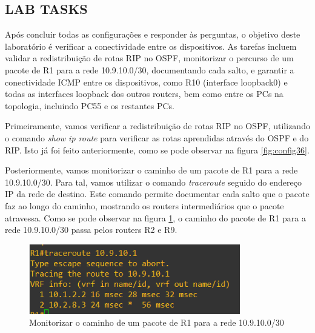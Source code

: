 \documentclass[11pt,english, openright, oneside]{book}
\begin{document}
\newpage
\subsection{LAB TASKS}
\vspace{0.2cm}

\par Após concluir todas as configurações e responder às perguntas, o objetivo deste laboratório é verificar a conectividade entre os dispositivos.  As tarefas incluem validar a redistribuição de rotas RIP no OSPF, monitorizar o percurso de um pacote de R1 para a rede 10.9.10.0/30, documentando cada salto, e garantir a conectividade ICMP entre os dispositivos, como R10 (interface loopback0) e todas as interfaces loopback dos outros routers, bem como entre os PCs na topologia, incluindo PC55 e os restantes PCs.
\vspace{0.2cm}

\par Primeiramente, vamos verificar a redistribuição de rotas RIP no OSPF, utilizando o comando \textit{show ip route} para verificar as rotas aprendidas através do OSPF e do RIP. Isto já foi feito anteriormente, como se pode observar na figura \ref{fig:config36}.
\vspace{0.2cm}

\par Posteriormente, vamos monitorizar o caminho de um pacote de R1 para a rede 10.9.10.0/30. Para tal, vamos utilizar o comando \textit{traceroute} seguido do endereço IP da rede de destino. Este comando permite documentar cada salto que o pacote faz ao longo do caminho, mostrando os routers intermediários que o pacote atravessa. Como se pode observar na figura \ref{fig:config39}, o caminho do pacote de R1 para a rede 10.9.10.0/30 passa pelos routers R2 e R9.
\vspace{0.2cm}

\begin{figure}[H]
  \centering
  \includegraphics[width=0.82\textwidth]{imagens/Tarefa4/23.traceroute_R1_10.9.10.1.png}
  \caption{Monitorizar o caminho de um pacote de R1 para a rede 10.9.10.0/30}
  \label{fig:config39}
\end{figure}
\vspace{0.2cm}
\end{document}
